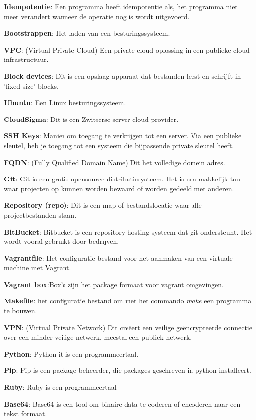 \textbf{Idempotentie}: Een programma heeft idempotentie als, het programma niet meer verandert wanneer de operatie nog is wordt uitgevoerd.

\textbf{Bootstrappen}: Het laden van een besturingssysteem.

\textbf{VPC}: (Virtual Private Cloud) Een private cloud oplossing in een publieke cloud infrastructuur.

\textbf{Block devices}: Dit is een opslaag apparaat dat bestanden leest en schrijft in 'fixed-size' blocks.	

\textbf{Ubuntu}: Een Linux besturingssysteem.

\textbf{CloudSigma}: Dit is een Zwitserse server cloud provider.

\textbf{SSH Keys}: Manier om toegang te verkrijgen tot een server. Via een publieke sleutel, heb je toegang tot een systeem die bijpassende private sleutel heeft.

\textbf{FQDN}: (Fully Qualified Domain Name) Dit het volledige domein adres.

\textbf{Git}: Git is een gratis opensource distributiesysteem. Het is een makkelijk tool waar projecten op kunnen worden bewaard of worden gedeeld met anderen.

\textbf{Repository (repo)}: Dit is een map of bestandslocatie waar alle projectbestanden staan.

\textbf{BitBucket}: Bitbucket is een repository hosting systeem dat git ondersteunt. Het wordt vooral gebruikt door bedrijven.

\textbf{Vagrantfile}: Het configuratie bestand voor het aanmaken van een virtuale machine met Vagrant.

\textbf{Vagrant box}:Box's zijn het package formaat voor vagrant omgevingen.

\textbf{Makefile}: het configuratie bestand om met het commando \textit{make} een programma te bouwen.

\textbf{VPN}: (Virtual Private Network) Dit creëert een veilige geëncrypteerde connectie over een minder veilige netwerk, meestal een publiek netwerk.

\textbf{Python}: Python it is een programmeertaal.

\textbf{Pip}: Pip is een package beheerder, die packages geschreven in python installeert.

\textbf{Ruby}: Ruby is een programmeertaal

\textbf{Base64}: Base64 is een tool om binaire data te coderen of encoderen naar een tekst formaat.